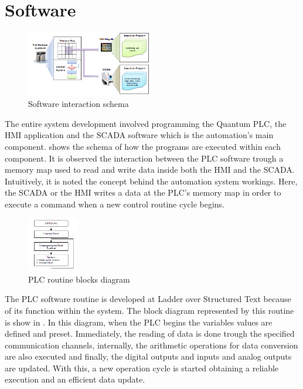 
\section{Software}

\begin{figure}
  \centering
  \includegraphics[width=0.5\textwidth]{img/software.png}
  \caption{Software interaction schema}
  \label{fig:software}
\end{figure}

The entire system development involved programming the Quantum PLC,
the HMI application and the SCADA software which is the automation's
main component.  shows the schema of how the programs are
executed within each component. It is observed the interaction between
the PLC software trough a memory map used to read and write data
inside both the HMI and the SCADA. Intuitively, it is noted the
concept behind the automation system workings. Here, the SCADA or the
HMI writes a data at the PLC's memory map in order to execute a
command when a new control routine cycle begins.

\begin{figure}
  \centering
  \includegraphics[width=0.2\textwidth]{img/plc.png}
  \caption{PLC routine blocks diagram}
  \label{fig:plc}
\end{figure}

The PLC software routine is developed at Ladder over Structured Text
because of its function within the system. The block diagram
represented by this routine is show in . In this diagram,
when the PLC begins the variables values are defined and preset. Immediately, the
reading of data is done trough the specified communication channels,
internally, the arithmetic operations for data conversion are also
executed and finally, the digital outputs and inputs and analog
outputs are updated. With this, a new operation cycle is started
obtaining a reliable execution and an efficient data update.

